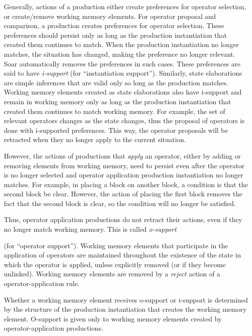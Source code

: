 Generally, actions of a production either create preferences for
operator selection, or create/remove working memory elements.  For
operator proposal and comparison, a production creates preferences for
operator selection.  These preferences should persist only as long as
the production instantiation that created them continues to match.  When
the production instantiation no longer matches, the situation has
changed, making the preference no longer relevant.  Soar automatically
removes the preferences in such cases.  These preferences are said to
have \emph{i-support} (for ``instantiation support'').  Similarly, state
elaborations are simple inferences that are valid only so long as the
production matches.  Working memory elements created as state
elaborations also have i-support and remain in working memory only as
long as the production instantiation that created them continues to
match working memory.  For example, the set of relevant operators changes
as the state changes, thus the proposal of operators is done with
i-supported preferences. This way, the operator proposals will be
retracted when they no longer apply to the current situation.

However, the actions of productions that \emph{apply} an operator, either by
adding or removing elements from working memory, need to persist even
after the operator is no longer selected and operator application
production instantiation no longer matches.  For example, in placing a
block on another block, a condition is that the second block be
clear. However, the action of placing the first block removes the fact
that the second block is clear, so the condition will no longer be
satisfied.

Thus, operator application productions do not retract their actions, even
if they no longer match working memory.  This is called \emph{o-support}

(for ``operator support''). Working memory elements that participate in
the application of operators are maintained throughout the existence of
the state in which the operator is applied, unless explicitly removed (or
if they become unlinked).  Working memory elements are removed by a
\emph{reject} action of a operator-application rule.  

Whether a working memory element receives o-support or i-support is
determined by the structure of the production instantiation that creates
the working memory element.  O-support is given only to working memory
elements created by operator-application productions.

